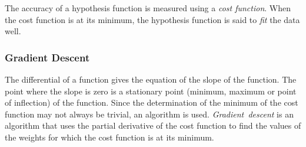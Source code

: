 The accuracy of a hypothesis function is measured using a \emph{cost function}.
When the cost function is at its minimum, the hypothesis function is said to \emph{fit} the data well.

\subsubsection{Gradient Descent}

The differential of a function gives the equation of the slope of the function.
The point where the slope is zero is a stationary point (minimum, maximum or point of inflection) of the function.
Since the determination of the minimum of the cost function may not always be trivial, an algorithm is used.
\emph{Gradient~descent} is an algorithm that uses the partial derivative of the cost function to find the values of the weights for which the cost function is at its minimum.
